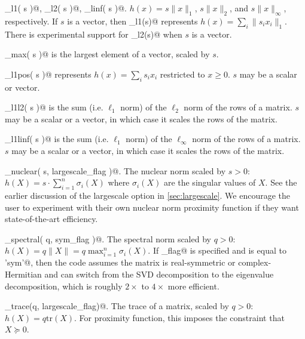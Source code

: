 \documentclass{article}
\newcommand{\<}{\langle}
\renewcommand{\>}{\rangle}
\begin{document}
\begin{trivlist}
\item \verb@prox_l1( s )@, \verb@prox_l2( s )@, \verb@prox_linf( s )@. $h(x)=s\|x\|_1$, $s\|x\|_2$, and $s\|x\|_\infty$, respectively.  If $s$ is a vector, then \verb@prox_l1(s)@ represents $h(x) = \sum_i \|s_i x_i\|_1$. There is experimental support for \verb@prox_l2(s)@ when $s$ is a vector.
\item \verb@prox_max( s )@ is the largest element of a vector, scaled by $s$.
\item \verb@prox_l1pos( s )@ represents $h(x) = \sum_i s_i x_i$ restricted to $x \ge 0$. $s$ may be a scalar or vector.
\item \verb@prox_l1l2( s )@ is the sum (i.e. $\ell_1$ norm) of the $\ell_2$ norm of the rows of a matrix.
    $s$ may be a scalar or a vector, in which case it scales the rows of the matrix.
\item \verb@prox_l1linf( s )@ is the sum (i.e. $\ell_1$ norm) of the $\ell_\infty$ norm of the rows of a matrix.
    $s$ may be a scalar or a vector, in which case it scales the rows of the matrix.
\item \verb@prox_nuclear( s, largescale_flag )@. The nuclear norm scaled by $s>0$: $h(X) = s\cdot \sum_{i=1}^n \sigma_i(X)$ where $\sigma_i(X)$ are the singular values of $X$. 
    See the earlier discussion of the largescale option in \ref{sec:largescale}.
    We encourage the user to experiment with their own nuclear norm proximity function if they want state-of-the-art efficiency.
\item \verb@prox_spectral( q, sym_flag )@. The spectral norm scaled by $q>0$: $h(X) = q \|X\| = q \max_{i=1}^n \sigma_i(X)$.
    If \verb@sym_flag@ is specified and is equal to \verb@'sym'@, then the code
    assumes the matrix is real-symmetric or complex-Hermitian and can switch
    from the SVD decomposition to the eigenvalue decomposition, which is
    roughly $2\times$ to $4\times$ more efficient.
\item \verb@prox_trace(q, largescale_flag)@. The trace of a matrix, scaled by $q>0$: $h(X) = q\text{tr}(X)$. For proximity function, this imposes the constraint that $X \succeq 0$.

\end{trivlist}
\end{document}
